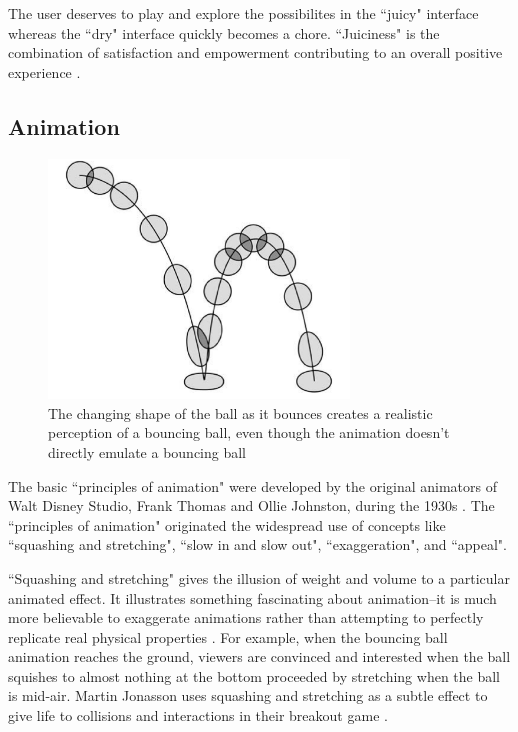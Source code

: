 The user deserves to play and explore the possibilites in the ``juicy" interface whereas the ``dry" interface quickly becomes a chore. ``Juiciness" is the combination of satisfaction and empowerment contributing to an overall positive experience \cite{atanasov}.


\subsection{Animation}

\begin{figure}
\begin{center}
\includegraphics[width=80mm]{images/bounce.pdf}
\caption{The changing shape of the ball as it bounces creates a realistic perception of a bouncing ball, even though the animation doesn’t directly emulate a bouncing ball}
\label{fig:bounce}
\end{center}
\end{figure}

The basic ``principles of animation" were developed by the original animators of Walt Disney Studio, Frank Thomas and Ollie Johnston, during the 1930s \cite{thomas1981disney}. The ``principles of animation" originated the widespread use of concepts like ``squashing and stretching", ``slow in and slow out", ``exaggeration", and ``appeal". 

``Squashing and stretching" gives the illusion of weight and volume to a particular animated effect. It illustrates something fascinating about animation--it is much more believable to exaggerate animations rather than attempting to perfectly replicate real physical properties \cite{swink2009game}. For example, when the bouncing ball animation reaches the ground, viewers are convinced and interested when the ball squishes to almost nothing at the bottom proceeded by stretching when the ball is mid-air. Martin Jonasson uses squashing and stretching as a subtle effect to give life to collisions and interactions in their breakout game \cite{juiceitorloseit}.


